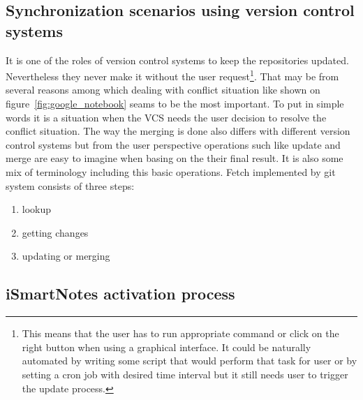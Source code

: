 \subsection{Synchronization scenarios using version control systems}\label{subsec:sync_scenarios}
It is one of the roles of version control systems to keep the repositories updated. Nevertheless they never make it without the user request\footnote{This means that the user has to run appropriate command or click on the right button when using a graphical interface. It could be naturally automated by writing some script that would perform that task for user or by setting a cron job with desired time interval but it still needs user to trigger the update process.}. That may be from several reasons among which dealing with conflict situation like shown on figure~\ref{fig:google_notebook} seams to be the most important. To put in simple words it is a situation when the VCS needs the user decision to resolve the conflict situation. The way the merging is done also differs with different version control systems but from the user perspective operations such like update and merge are easy to imagine when basing on the their final result. It is also some mix of terminology including this basic operations. Fetch implemented by git system consists of three steps:
\begin{enumerate}
\item{lookup}
\item{getting changes}
\item{updating or merging}
\end{enumerate}
\subsection{iSmartNotes activation process}\label{subsec:ismartnotes_activation}
